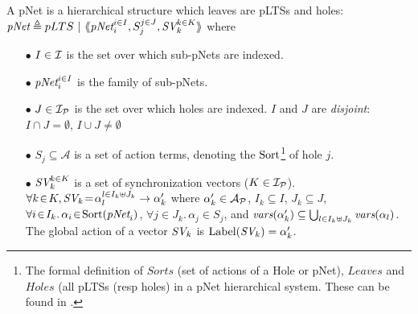 \documentclass{lncs/llncs}
\def\AlgA{\mathcal{A}}
\begin{document}
\begin{definition}[pNets]\label{def-pnets}
A pNet is a hierarchical structure which leaves are pLTSs and holes:\\
$\pNet\triangleq pLTS~|~\mylangle \pNet_i^{i\in I}, S_j^{j\in J}, \symb{SV}_k^{k\in K}\myrangle$
where
\begin{itemize}
\item[$\bullet$] $I \in \I$ is the set over which sub-pNets are indexed.
\item[$\bullet$] $\pNet_i^{i\in I}$ is the family of sub-pNets.

\item[$\bullet$] $J\in\I_\P$ is the set over which holes are indexed.
$I$ and $J$ are \emph{disjoint}: $I\cap J=\emptyset$,  $I\cup J\neq\emptyset$

\item[$\bullet$] $S_j \subseteq \AlgA$ is a set of action terms,
  denoting the $\Sort$\footnote{The formal definition of $Sorts$ (set of actions of a Hole
  or pNet), $Leaves$ and $Holes$ (all pLTSs (resp holes) in a pNet
  hierarchical system. These can be found in \cite{henrio:Forte2016}.}
  of hole $j$. 

\item[$\bullet$] $\symb{SV}_k^{k\in K}$ is a set of
  synchronization vectors ($K\in\I_\P$). $\forall k\!\in\! K,
  \symb{SV}_k\!=\!\alpha_{l}^{l\in I_k \uplus J_k}\to\alpha'_k$ where
  $\alpha'_k\in \mathcal{A}_\P$, $I_k\subseteq I$, $J_k\subseteq J$,
  $\forall i\!\in\! I_k.\,\alpha_{i}\!\in\!\Sort(\pNet_i)$,
  $\forall j\!\in\!
  J_k.\,\alpha_{j}\!\in\!S_j$, and $\vars(\alpha'_k)\subseteq \bigcup_{l\in I_k\uplus 
  J_k}{\vars({\alpha_l})}$. The global action of a vector $\symb{SV}_k$ is
$\Label(\symb{SV}_k) = \alpha'_k$.


\end{itemize}
\end{definition}


\end{document}

